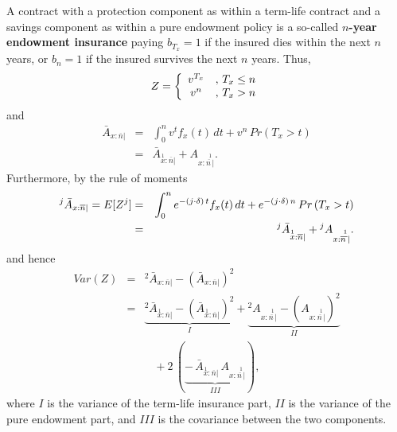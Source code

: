 \documentclass[11pt,fleqn,oneside]{book}
\begin{document}
A contract with a protection component as within a term-life contract and a savings component as within a pure endowment policy is a so-called \textbf{$n$-year endowment insurance} paying $b_{T_x}=1$ if the insured dies within the next $n$ years, or $b_n=1$ if the insured survives the next $n$ years. Thus,
$$
Z = \left\{
\begin{array}{c l}
v^{T_x} &,\,T_x\leq n\\
v^n        &,\,T_x > n
\end{array}
\right.
$$
and
\begin{eqnarray*}
{\bar{A}_{x:\overline{n}|}} &=& \int_0^n v^t f_{x}(t)\,dt + v^n \, Pr\left(T_x>t\right)\\
&=& {\bar{A}_{\stackrel{1}{x}:\overline{n}|}} + {A_{x:\stackrel{1}{\overline{n\,}|}}}.
\end{eqnarray*}
Furthermore, by the rule of moments
\begin{eqnarray*}
{^j\bar{A}_{x:\overline{n}|}} = E[Z^j] &=& \int_0^n e^{-(j \cdot \delta)\,t} f_{x}(t)\,dt +e^{-(j \cdot \delta)\,n}\, Pr\left(T_x>t\right)\\
&=& {^j\bar{A}_{\stackrel{1}{x}:\overline{n}|}}} + {^j A_{x:\stackrel{1}{\overline{n\,}|}}.
\end{eqnarray*}
and hence
\begin{eqnarray*}
Var(Z) &=& {^2\bar{A}_{x:\overline{n}|}} - \left({\bar{A}_{x:\overline{n}|}} \right)^2 \\
&=& \underbrace{{^2\bar{A}_{\stackrel{1}{x}:\overline{n}|}} - \left({\bar{A}_{\stackrel{1}{x}:\overline{n}|}}\right)^2}_{I} +  \underbrace{{^2A_{x:\stackrel{1}{\overline{n\,}|}}} - \left(A_{x:\stackrel{1}{\overline{n\,}|}}\right)^2}_{II} \\
&\;& \;\;\; + 2\,\left( \underbrace{-\,  {\bar{A}_{\stackrel{1}{x}:\overline{n}|}}\,{A_{x:\stackrel{1}{\overline{n\,}|}}}}_{III} \right),
\end{eqnarray*}
where $I$ is the variance of the term-life insurance part, $II$ is the variance of the pure endowment part, and $III$ is the covariance between the two components.
\end{document}
